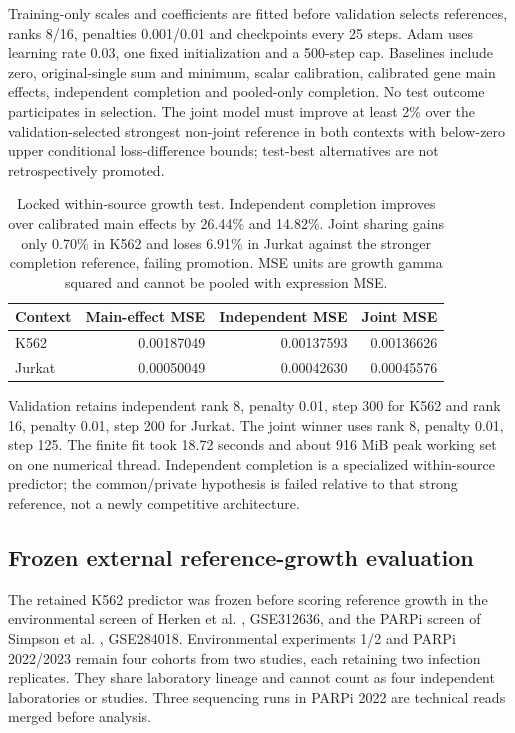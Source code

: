 Training-only scales and coefficients are fitted before validation selects references, ranks 8/16, penalties 0.001/0.01 and checkpoints every 25 steps. Adam uses learning rate 0.03, one fixed initialization and a 500-step cap. Baselines include zero, original-single sum and minimum, scalar calibration, calibrated gene main effects, independent completion and pooled-only completion. No test outcome participates in selection. The joint model must improve at least 2\% over the validation-selected strongest non-joint reference in both contexts with below-zero upper conditional loss-difference bounds; test-best alternatives are not retrospectively promoted.

\begin{table}[htbp]\centering\small
\begin{tabular}{lrrr}\toprule
Context & Main-effect MSE & Independent MSE & Joint MSE\\\midrule
K562 & 0.00187049 & 0.00137593 & 0.00136626\\
Jurkat & 0.00050049 & 0.00042630 & 0.00045576\\\bottomrule
\end{tabular}
\caption{Locked within-source growth test. Independent completion improves over calibrated main effects by 26.44\% and 14.82\%. Joint sharing gains only 0.70\% in K562 and loses 6.91\% in Jurkat against the stronger completion reference, failing promotion. MSE units are growth gamma squared and cannot be pooled with expression MSE.}
\label{tab:growth-internal}\end{table}

Validation retains independent rank 8, penalty 0.01, step 300 for K562 and rank 16, penalty 0.01, step 200 for Jurkat. The joint winner uses rank 8, penalty 0.01, step 125. The finite fit took 18.72 seconds and about 916 MiB peak working set on one numerical thread. Independent completion is a specialized within-source predictor; the common/private hypothesis is failed relative to that strong reference, not a newly competitive architecture.

\subsection{Frozen external reference-growth evaluation}
The retained K562 predictor was frozen before scoring reference growth in the environmental screen of Herken et al. \citep{herken2026}, GSE312636, and the PARPi screen of Simpson et al. \citep{simpson2023}, GSE284018. Environmental experiments 1/2 and PARPi 2022/2023 remain four cohorts from two studies, each retaining two infection replicates. They share laboratory lineage and cannot count as four independent laboratories or studies. Three sequencing runs in PARPi 2022 are technical reads merged before analysis.

